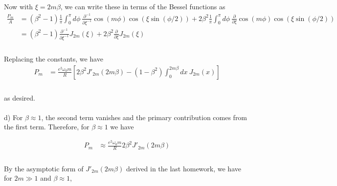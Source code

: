\documentclass[]{article}
\begin{document}
Now with $\xi = 2m \beta$, we can write these in terms of the Bessel functions as \\

\begin{equation}
\begin{aligned}
\frac{ P_m }{ A} & =  (\beta^2 - 1 ) \frac{ 1 }{  \pi } \int_{0}^{\pi} d\phi \:  \frac{ \partial^{-1} }{ \partial \xi^{-1} }\cos( m\phi )  \cos( \xi \sin( \phi/2) )   +  2 \beta^2   \frac{ 1 }{  \pi } \int_{0}^{\pi} d\phi \: \frac{ \partial }{ \partial \xi } \cos( m\phi )   \cos( \xi \sin( \phi/2) ) \\
& = (\beta^2 - 1 )  \frac{ \partial^{-1} }{ \partial \xi^{-1} } J_{2m}(\xi)  +  2 \beta^2   \frac{ \partial }{ \partial \xi } J_{2m}(\xi) \\
\end{aligned} 
\end{equation} \\

Replacing the constants, we have \\

\begin{equation}
\begin{aligned}
P_m & = \frac{ e^2 \omega_0 m  }{ R}  \left[  2 \beta^2    J'_{2m}( 2 m \beta ) -  ( 1 - \beta^2  ) \int_{0}^{2m\beta} dx \:  J_{2m}(x)  \right]    \\
\end{aligned} 
\end{equation} \\

as desired. \\

\hfill \\

d) For $\beta \approx 1$, the second term vanishes and the primary contribution comes from the first term. Therefore, for $\beta \approx 1$ we have

\begin{equation}
\begin{aligned}
P_m & \approx \frac{ e^2 \omega_0 m  }{ R}  2 \beta^2    J'_{2m}( 2 m \beta )    \\
\end{aligned} 
\end{equation} \\

By the asymptotic form of $ J'_{2m}( 2 m \beta )$ derived in the last homework, we have for $2m\gg 1$ and $\beta \approx 1$,  \\
\end{document}
